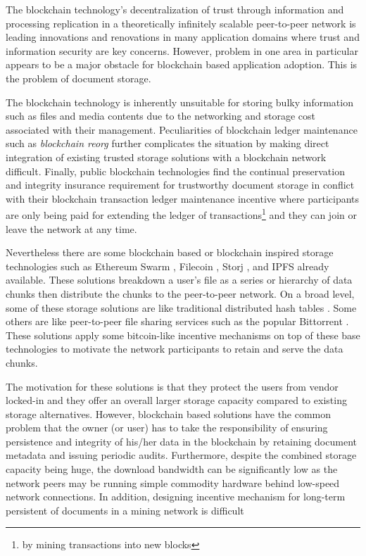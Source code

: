 \documentclass[conference]{IEEEtran}
\begin{document}
The blockchain technology's decentralization of trust through information and processing replication in a theoretically infinitely scalable peer-to-peer network is leading innovations and renovations in many application domains where trust and information security are key concerns. However, problem in one area in particular appears to be a major obstacle for blockchain based application adoption. This is the problem of document storage. 

The blockchain technology is inherently unsuitable for storing bulky information such as files and media contents due to the networking and storage cost associated with their management. Peculiarities of blockchain ledger maintenance such as \textit{blockchain reorg} \cite{reorg} further complicates the situation by making direct integration of existing trusted storage solutions with a blockchain network difficult. Finally, public blockchain technologies find the continual preservation and integrity insurance requirement for trustworthy document storage in conflict with their blockchain transaction ledger maintenance incentive where participants are only being paid for extending the ledger of transactions\footnote{by mining transactions into new blocks} and they can join or leave the network at any time.      

Nevertheless there are some blockchain based or blockchain inspired storage technologies such as Ethereum Swarm \cite{swarm}, Filecoin \cite{filecoin}, Storj \cite{Wilkinson14storja}, and IPFS \cite{ipfs} already available. These solutions breakdown a user's file as a series or hierarchy of data chunks then distribute the chunks to the peer-to-peer network. On a broad level, some of these storage solutions are like traditional distributed hash tables \cite{Maymounkov:2002:KPI:646334.687801} \cite{10.1007/978-3-540-45172-3_4}. Some others are like peer-to-peer file sharing services such as the popular Bittorrent \cite{Pouwelse:2005:BPF:2138958.2138984}. These solutions apply some bitcoin-like incentive mechanisms on top of these base technologies to motivate the network participants to retain and serve the data chunks.  

The motivation for these solutions is that they protect the users from vendor locked-in and they offer an overall larger storage capacity compared to existing storage alternatives. However, blockchain based solutions have the common problem that the owner (or user) has to take the responsibility of ensuring persistence and integrity of his/her data in the blockchain by retaining document metadata and issuing periodic audits. Furthermore, despite the combined storage capacity being huge, the download bandwidth can be significantly low as the network peers may be running simple commodity hardware behind low-speed network connections. In addition, designing incentive mechanism for long-term persistent of documents in a mining network is difficult 
\end{document}
